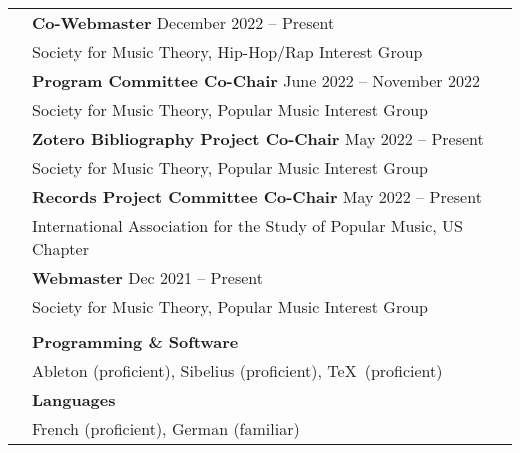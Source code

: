 \documentclass[letterpaper, 11pt]{article}
\begin{document}
\begin{longtable}{p{1.3in}p{4.8in}}
{\color{OliveGreen}{Professional Service}}
& \textbf{Co-Webmaster} \hfill December 2022  -- Present \\
& Society for Music Theory, Hip-Hop/Rap Interest Group \\
& \textbf{Program Committee Co-Chair} \hfill June 2022  -- November 2022 \\
& Society for Music Theory, Popular Music Interest Group \\
& \textbf{Zotero Bibliography Project Co-Chair} \hfill May 2022  -- Present \\
& Society for Music Theory, Popular Music Interest Group \\
& \textbf{Records Project Committee Co-Chair} \hfill May 2022  -- Present \\
& International Association for the Study of Popular Music, US Chapter\\
& \textbf{Webmaster} \hfill Dec 2021  -- Present \\
& Society for Music Theory, Popular Music Interest Group\\
& \\

{\color{OliveGreen}{Proficiencies}}
& \textbf{Programming \& Software} \\
& Ableton (proficient), Sibelius (proficient), \TeX~(proficient)\\
& \textbf{Languages} \\
& French (proficient), German (familiar) \\

\end{longtable}
\end{document}
